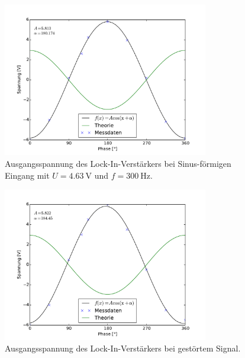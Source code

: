 \begin{figure}[hp]
	\centering
	\includegraphics[width=0.8\textwidth]{Bilder/AusgangSpannung.pdf}
	\caption{Ausgangsspannung des Lock-In-Verstärkers bei Sinus-förmigen Eingang mit $U = \SI{4.63}{\volt}$ und $f = \SI{300}{\hertz}$.}
	\label{diag:spannung}
\end{figure}

\begin{figure}[hp]
	\centering
	\includegraphics[width=0.8\textwidth]{Bilder/AusgangStoerung.pdf}
	\caption{Ausgangsspannung des Lock-In-Verstärkers bei gestörtem Signal.}
	\label{diag:stoerung}
\end{figure}


